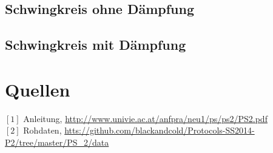 \documentclass[12pt,a4paper]{article}
\begin{document}
\begin{multicols}{2}
\subsection{Schwingkreis ohne Dämpfung}
\subsection{Schwingkreis mit Dämpfung}


\section{Quellen}
$[1]$ Anleitung, \url{http://www.univie.ac.at/anfpra/neu1/ps/ps2/PS2.pdf}\\
$[2]$ Rohdaten, \url{htts://github.com/blackandcold/Protocols-SS2014-P2/tree/master/PS_2/data}\\

\end{multicols}
\end{document}
